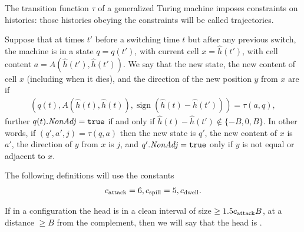 \documentclass[12pt]{memoir}
\renewcommand{\ge}{\geq}
\newcommand{\fld}[1]{\ensuremath{\textit{#1\/}}}
\newcommand{\sign}{\mathop\mathrm{sign}}
\def\B{B}
\newcommand{\hc}{\hat h}
\newcommand{\CDwell}{\cns{dwell}}
\newcommand{\NonAdj}{\fld{NonAdj}}
\newcommand{\cns}[1]{c_{\textrm{\upshape #1}}}
\newcommand{\CAtt}{\cns{attack}}
\newcommand{\CSpill}{\cns{spill}}
\begin{document}
The transition function \( \tau \) of a generalized Turing machine
imposes constraints on histories: those
histories obeying the constraints will be called trajectories.

\begin{definition}
Suppose that at times \( t' \) before a switching time \( t \) but after 
any previous switch,
the machine is in a state \( q=q(t') \), with current cell \( x=\hc(t') \), 
with cell content \( a=A(\hc(t'),\hc(t')) \).
We say that the new state, the new content of cell \( x \) (including when it dies),
and the direction of the new position \( y \) from \( x \)
are  if 
\begin{align*}
 (q(t),A(\hc(t),\hc(t)),\sign(\hc(t)-\hc(t'))) =  \tau(a,q),   
 \end{align*}
further \( q(t).\NonAdj=\true \) if and only if \( \hc(t)-\hc(t')\notin\{-B,0,B\} \).
In other words, if \( (q',a',j)=\tau(q,a) \) then the new state is \( q' \),
the new content of \( x \) is \( a' \), the direction of \( y \) from \( x \) is \( j \),
and \( q'.\NonAdj=\true \) only if \( y \) is not equal or adjacent to \( x \).
\end{definition}

The following definitions will use the constants
\begin{align}\label{eq:cns.traj}
   \CAtt =6, \CSpill =5, \CDwell.
 \end{align}


 \begin{definition}\label{def:clean-hole}
   If in a configuration the head is in a clean interval of size \( \ge 1.5 \CAtt\B \),
at a distance \( \ge\B \) from the complement, then we will say that the head is .
 \end{definition}
\end{document}
